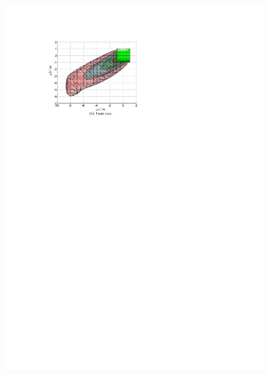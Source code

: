 \begin{figure}[h]
\begin{minipage}{0.45\linewidth}
		\includegraphics[width=0.9\linewidth]{Figures/Figs_Ch13/Fig8_2}
	\end{minipage}	
	\begin{minipage}{0.45\linewidth}
		\centering

\end{minipage}
\end{figure}
